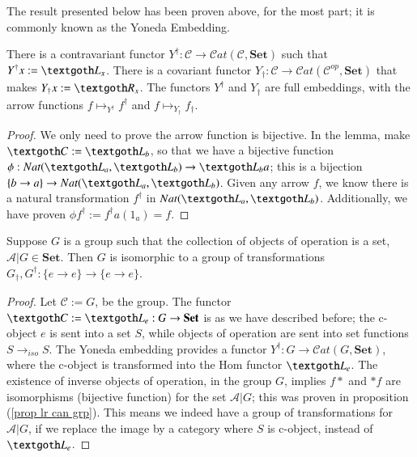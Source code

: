 \documentclass [12pt]{book}
\begin{document}
The result presented below has been proven above, for the most part; it is commonly known as the Yoneda Embedding.

\begin{corollary}There is a contravariant functor $Y^\dagger:\mathcal C\rightarrow\mathcal Cat(\mathcal C,\textbf{Set})$ such that $Y^\dagger x:=\textgoth L_x$. There is a covariant functor $Y_\dagger:\mathcal C\rightarrow\mathcal Cat(\mathcal C^{op},\textbf{Set})$ that makes $Y_\dagger x:=\textgoth R_x$. The functors $Y^\dagger$ and $Y_\dagger$ are full embeddings, with the arrow functions $f\mapsto_{Y^\dagger}f^\dagger$ and $f\mapsto_{Y_\dagger} f_\dagger$.\end{corollary}

\begin{proof}We only need to prove the arrow function is bijective. In the lemma, make $\textgoth C:=\textgoth L_b$, so that we have a bijective function $\phi:Nat(\textgoth L_a,\textgoth L_b)\rightarrow\textgoth L_ba$; this is a bijection $\{b\rightarrow a\}\rightarrow Nat(\textgoth L_a,\textgoth L_b)$. Given any arrow $f$, we know there is a natural transformation $f^\dagger$ in $Nat(\textgoth L_a,\textgoth L_b)$. Additionally, we have proven $\phi f^\dagger:=f^\dagger a(1_a)=f$.\end{proof}

\begin{corollary}Suppose $G$ is a group such that the collection of objects of operation is a set, $\mathcal A|G\in\textbf{Set}$. Then $G$ is isomorphic to a group of transformations $G_\dagger,G^\dagger:\{e\rightarrow e\}\rightarrow\{e\rightarrow e\}$.\end{corollary}

\begin{proof}Let $\mathcal C:=G$, be the group. The functor $\textgoth C:=\textgoth L_e:G\rightarrow\textbf{Set}$ is as we have described before; the c-object $e$ is sent into a set $S$, while objects of operation are sent into set functions $S\rightarrow_{iso}S$. The Yoneda embedding provides a functor $Y^\dagger:G\rightarrow\mathcal Cat(G,\textbf{Set})$, where the c-object is transformed into the Hom functor $\textgoth L_e$. The existence of inverse objects of operation, in the group $G$, implies $f*$ and $*f$ are isomorphisms (bijective function) for the set $\mathcal A|G$; this was proven in proposition (\ref{prop lr can grp}). This means we indeed have a group of transformations for $\mathcal A|G$, if we replace the image by a category where $S$ is c-object, instead of $\textgoth L_e$.\end{proof}
\end{document}
